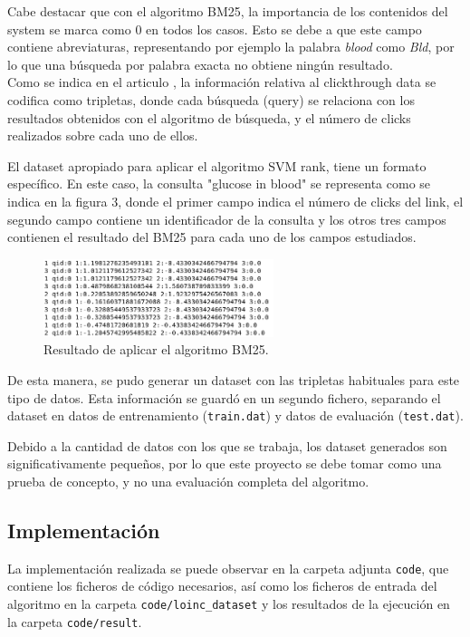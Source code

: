 \documentclass[a4paper,12pt]{article}
\begin{document}
	Cabe destacar que con el algoritmo BM25, la importancia de los contenidos del system se marca como $0$ en todos los casos. Esto se debe a que este campo contiene abreviaturas, representando por ejemplo la palabra \textit{blood} como \textit{Bld}, por lo que una búsqueda por palabra exacta no obtiene ningún resultado.\\
	
	Como se indica en el articulo \cite{articulo-clase}, la información relativa al clickthrough data se codifica como tripletas, donde cada búsqueda (query) se relaciona con los resultados obtenidos con el algoritmo de búsqueda, y el número de clicks realizados sobre cada uno de ellos.
	
	
	El dataset apropiado para aplicar el algoritmo SVM rank, tiene un formato específico. En este caso, la consulta "glucose in blood" se representa como se indica en la figura 3, donde el primer campo indica el número de clicks del link, el segundo campo contiene un identificador de la consulta y los otros tres campos contienen el resultado del BM25 para cada uno de los campos estudiados.
	
	\begin{figure}[H]
		\centering
		\includegraphics[width=0.6\textwidth]{include/SVMinput_glucoseBlood.png}
		\caption{Resultado de aplicar el algoritmo BM25.}
	\end{figure}
	
	De esta manera, se pudo generar un dataset con las tripletas habituales para este tipo de datos. Esta información se guardó en un segundo fichero, separando el dataset en datos de entrenamiento (\texttt{train.dat}) y datos de evaluación (\texttt{test.dat}).
	
	Debido a la cantidad de datos con los que se trabaja, los dataset generados son significativamente pequeños, por lo que este proyecto se debe tomar como una prueba de concepto, y no una evaluación completa del algoritmo.
	
	\subsection{Implementación}
	
	La implementación realizada se puede observar en la carpeta adjunta \texttt{code}, que contiene los ficheros de código necesarios, así como los ficheros de entrada del algoritmo en la carpeta \texttt{code/loinc\_dataset} y los resultados de la ejecución en la carpeta \texttt{code/result}.
	
\end{document}
